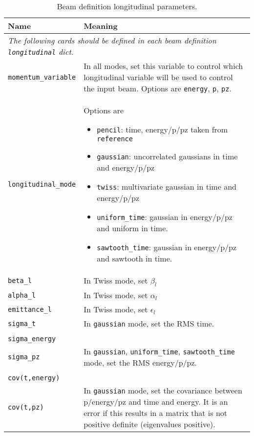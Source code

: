 \begin{table*}
\begin{center}
\caption{Beam definition longitudinal parameters.}
\begin{tabularx}{\linewidth}{lX}
Name & Meaning \\
\hline
\multicolumn{2}{l}{\emph{The following cards should be defined in each beam definition \verb|longitudinal| dict.}} \\
\hline
\verb|momentum_variable| & In all modes, set this variable to control which longitudinal variable will be used to control the input beam. Options are \verb|energy|, \verb|p|, \verb|pz|. \\
\verb|longitudinal_mode| & Options are
                          \begin{itemize}
                            \setlength{\itemsep}{0mm}
                            \item \verb|pencil|: time, energy/p/pz taken from \verb|reference|
                            \item \verb|gaussian|: uncorrelated gaussians in time and energy/p/pz
                            \item \verb|twiss|: multivariate gaussian in time and energy/p/pz
                            \item \verb|uniform_time|: gaussian in energy/p/pz and uniform in time.
                            \item \verb|sawtooth_time|: gaussian in energy/p/pz and sawtooth in time.
                          \end{itemize} \\
\hline
\verb|beta_l| & In Twiss mode, set $\beta_l$\\
\verb|alpha_l| & In Twiss mode, set $\alpha_l$\\
\verb|emittance_l| & In Twiss mode, set $\epsilon_l$\\
\hline
\verb|sigma_t| & In \verb|gaussian| mode, set the RMS time. \\
\hline
\begin{tabular}{l} \verb|sigma_p| \\ \verb|sigma_energy| \\ \verb|sigma_pz| \end{tabular} & In \verb|gaussian|, \verb|uniform_time|, \verb|sawtooth_time| mode, set the RMS energy/p/pz. \\
\hline
\begin{tabular}{l} \verb|cov(t,p)| \\ \verb|cov(t,energy)| \\ \verb|cov(t,pz)| \end{tabular} & In \verb|gaussian| mode, set the covariance between p/energy/pz and time and energy. It is an error if this results in a matrix that is not positive definite (eigenvalues positive).\\

\end{tabularx}
\end{center}
\end{table*}
